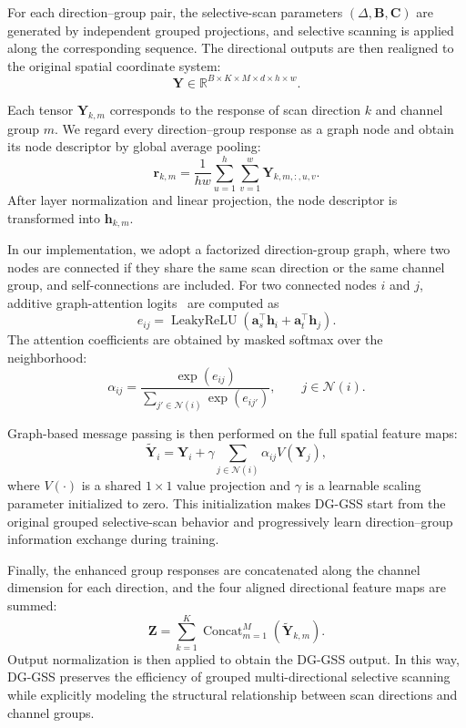 For each direction--group pair, the selective-scan parameters $(\Delta,\mathbf{B},\mathbf{C})$ are generated by independent grouped projections, and selective scanning is applied along the corresponding sequence. The directional outputs are then realigned to the original spatial coordinate system:
\begin{equation}
\mathbf{Y}\in\mathbb{R}^{B\times K\times M\times d\times h\times w}.
\end{equation}

Each tensor $\mathbf{Y}_{k,m}$ corresponds to the response of scan direction $k$ and channel group $m$. We regard every direction--group response as a graph node and obtain its node descriptor by global average pooling:
\begin{equation}
\mathbf{r}_{k,m}
=
\frac{1}{hw}
\sum_{u=1}^{h}
\sum_{v=1}^{w}
\mathbf{Y}_{k,m,:,u,v}.
\end{equation}
After layer normalization and linear projection, the node descriptor is transformed into $\mathbf{h}_{k,m}$.

In our implementation, we adopt a factorized direction-group graph, where two nodes are connected if they share the same scan direction or the same channel group, and self-connections are included. For two connected nodes $i$ and $j$, additive graph-attention logits~\cite{velickovic2018gat} are computed as
\begin{equation}
e_{ij}
=
\operatorname{LeakyReLU}
\left(
\mathbf{a}_{s}^{\top}\mathbf{h}_{i}
+
\mathbf{a}_{t}^{\top}\mathbf{h}_{j}
\right).
\end{equation}
The attention coefficients are obtained by masked softmax over the neighborhood:
\begin{equation}
\alpha_{ij}
=
\frac{\exp(e_{ij})}
{\sum_{j'\in\mathcal{N}(i)}\exp(e_{ij'})},
\qquad j\in\mathcal{N}(i).
\end{equation}

Graph-based message passing is then performed on the full spatial feature maps:
\begin{equation}
\widetilde{\mathbf{Y}}_i
=
\mathbf{Y}_i
+
\gamma
\sum_{j\in\mathcal{N}(i)}
\alpha_{ij}V(\mathbf{Y}_j),
\end{equation}
where $V(\cdot)$ is a shared $1\times1$ value projection and $\gamma$ is a learnable scaling parameter initialized to zero. This initialization makes DG-GSS start from the original grouped selective-scan behavior and progressively learn direction--group information exchange during training.

Finally, the enhanced group responses are concatenated along the channel dimension for each direction, and the four aligned directional feature maps are summed:
\begin{equation}
\mathbf{Z}
=
\sum_{k=1}^{K}
\operatorname{Concat}_{m=1}^{M}
\left(
\widetilde{\mathbf{Y}}_{k,m}
\right).
\end{equation}
Output normalization is then applied to obtain the DG-GSS output.
In this way, DG-GSS preserves the efficiency of grouped multi-directional selective scanning while explicitly modeling the structural relationship between scan directions and channel groups.



